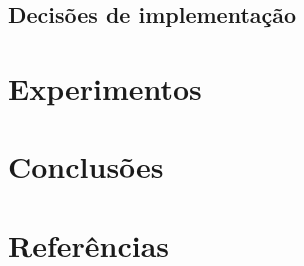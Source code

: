 \documentclass[11pt]{article}
\begin{document}
\subsection{Decisões de implementação}

\section{Experimentos}

\section{Conclusões}

\section{Referências}
\end{document}
